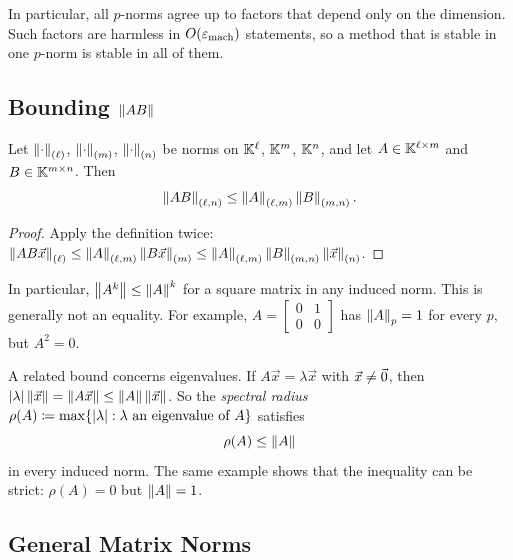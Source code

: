 In particular, all $p$-norms agree up to factors that depend only on the dimension. Such factors are harmless in $O(\varepsilon_{\mathrm{mach}})$ statements, so a method that is stable in one $p$-norm is stable in all of them.

\subsection{Bounding $\left\lVert AB \right\rVert$}

\begin{proposition}
  \label{prop:submult}
  Let $\left\lVert \cdot \right\rVert_{(\ell)}$, $\left\lVert \cdot \right\rVert_{(m)}$, $\left\lVert \cdot \right\rVert_{(n)}$ be norms on $\mathbb{K}^\ell$, $\mathbb{K}^m$, $\mathbb{K}^n$, and let $A \in \mathbb{K}^{\ell \times m}$ and $B \in \mathbb{K}^{m \times n}$. Then
  \begin{equation}
    \left\lVert AB \right\rVert_{(\ell,n)} \le \left\lVert A \right\rVert_{(\ell,m)}\left\lVert B \right\rVert_{(m,n)}.
  \end{equation}
\end{proposition}

\begin{proof}
  Apply the definition twice: $\left\lVert AB\vec{x} \right\rVert_{(\ell)} \le \left\lVert A \right\rVert_{(\ell,m)}\left\lVert B\vec{x} \right\rVert_{(m)} \le \left\lVert A \right\rVert_{(\ell,m)}\left\lVert B \right\rVert_{(m,n)}\left\lVert \vec{x} \right\rVert_{(n)}$.
\end{proof}

In particular, $\left\lVert A^k \right\rVert \le \left\lVert A \right\rVert^k$ for a square matrix in any induced norm. This is generally not an equality. For example, $A = \left[\begin{smallmatrix} 0 & 1 \\ 0 & 0 \end{smallmatrix}\right]$ has $\left\lVert A \right\rVert_p = 1$ for every $p$, but $A^2 = 0$.

A related bound concerns eigenvalues. If $A\vec{x} = \lambda\vec{x}$ with $\vec{x} \ne \vec{0}$, then $\left\lvert \lambda \right\rvert\left\lVert \vec{x} \right\rVert = \left\lVert A\vec{x} \right\rVert \le \left\lVert A \right\rVert\left\lVert \vec{x} \right\rVert$. So the \emph{spectral radius} $\rho(A) \coloneqq \max\{\left\lvert \lambda \right\rvert : \lambda \text{ an eigenvalue of } A\}$ satisfies
\begin{equation}
  \rho(A) \le \left\lVert A \right\rVert
\end{equation}
in every induced norm. The same example shows that the inequality can be strict: $\rho(A) = 0$ but $\left\lVert A \right\rVert = 1$.

\subsection{General Matrix Norms}

